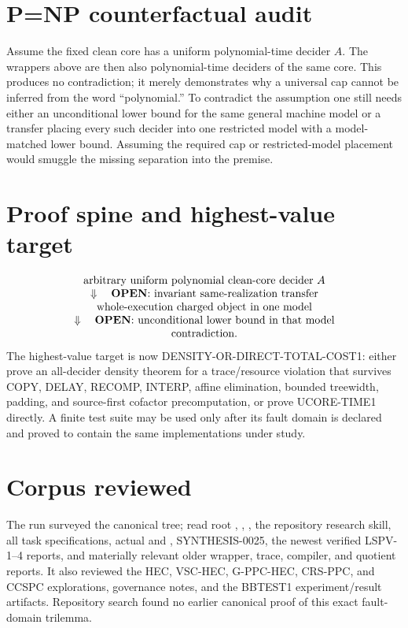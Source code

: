 \documentclass[11pt]{article}
\newcommand{\OPEN}{\textbf{OPEN}}
\begin{document}
\section*{P=NP counterfactual audit}
Assume the fixed clean core has a uniform polynomial-time decider \(A\).  The
wrappers above are then also polynomial-time deciders of the same core.  This
produces no contradiction; it merely demonstrates why a universal cap cannot
be inferred from the word ``polynomial.''  To contradict the assumption one
still needs either an unconditional lower bound for the same general machine
model or a transfer placing every such decider into one restricted model with
a model-matched lower bound.  Assuming the required cap or restricted-model
placement would smuggle the missing separation into the premise.

\section*{Proof spine and highest-value target}
\[
\begin{array}{c}
\text{arbitrary uniform polynomial clean-core decider }A\\
\Downarrow\quad\text{\OPEN: invariant same-realization transfer}\\
\text{whole-execution charged object in one model}\\
\Downarrow\quad\text{\OPEN: unconditional lower bound in that model}\\
\text{contradiction.}
\end{array}
\]
The highest-value target is now
\textsf{DENSITY-OR-DIRECT-TOTAL-COST1}: either prove an all-decider density
theorem for a trace/resource violation that survives COPY, DELAY, RECOMP,
INTERP, affine elimination, bounded treewidth, padding, and source-first
cofactor precomputation, or prove UCORE-TIME1 directly.  A finite test suite
may be used only after its fault domain is declared and proved to contain the
same implementations under study.

\section*{Corpus reviewed}
The run surveyed the canonical tree; read root ,
, , the repository research skill, all task
specifications, actual  and , SYNTHESIS-0025,
the newest verified LSPV-1--4 reports, and materially relevant older wrapper,
trace, compiler, and quotient reports.  It also reviewed the HEC, VSC-HEC,
G-PPC-HEC, CRS-PPC, and CCSPC explorations, governance notes, and the BBTEST1
experiment/result artifacts.  Repository search found no earlier canonical
proof of this exact fault-domain trilemma.
\end{document}
